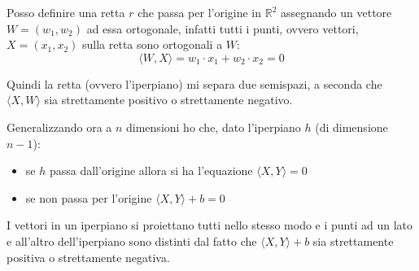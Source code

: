 Posso definire una retta $r$ che passa per l'origine in  $\mathbb{R}^2$ assegnando
un vettore $W=(w_1,w_2)$ ad essa ortogonale, infatti tutti i punti, ovvero
vettori, $X=(x_1,x_2)$ sulla retta sono ortogonali a $W$:
\begin{equation}
    \langle W,X\rangle=w_1\cdot x_1+w_2\cdot x_2=0
\end{equation}


Quindi la retta (ovvero l'iperpiano) mi separa due semispazi, a seconda che
$\langle X,W\rangle$ sia strettamente positivo o strettamente negativo.

Generalizzando ora a $n$ dimensioni ho che, dato l'iperpiano $h$ (di dimensione $n-1$):
\begin{itemize}
    \item se $h$ passa dall'origine allora si ha l'equazione $\langle X,Y\rangle=0$
    \item se non passa per l'origine $\langle X,Y\rangle +b=0$
\end{itemize}

I vettori in un iperpiano si proiettano tutti nello stesso modo e i punti ad un
lato e all'altro dell'iperpiano sono distinti dal fatto che $\langle X,Y\rangle +b$
sia strettamente positiva o strettamente negativa.
